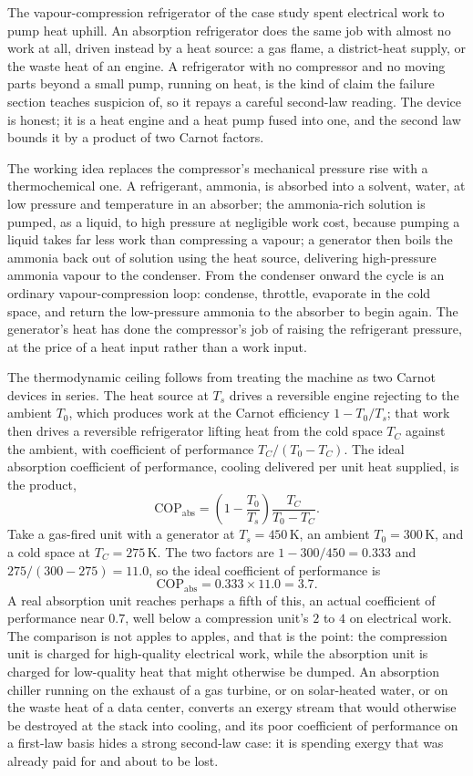 The vapour-compression refrigerator of the case study spent electrical work to
pump heat uphill. An absorption refrigerator does the same job with almost no
work at all, driven instead by a heat source: a gas flame, a district-heat
supply, or the waste heat of an engine. A refrigerator with no compressor and no
moving parts beyond a small pump, running on heat, is the kind of claim the
failure section teaches suspicion of, so it repays a careful second-law reading.
The device is honest; it is a heat engine and a heat pump fused into one, and the
second law bounds it by a product of two Carnot factors.

The working idea replaces the compressor's mechanical pressure rise with a
thermochemical one. A refrigerant, ammonia, is absorbed into a solvent, water,
at low pressure and temperature in an absorber; the ammonia-rich solution is
pumped, as a liquid, to high pressure at negligible work cost, because pumping a
liquid takes far less work than compressing a vapour; a generator then boils the
ammonia back out of solution using the heat source, delivering high-pressure
ammonia vapour to the condenser. From the condenser onward the cycle is an
ordinary vapour-compression loop: condense, throttle, evaporate in the cold
space, and return the low-pressure ammonia to the absorber to begin again. The
generator's heat has done the compressor's job of raising the refrigerant
pressure, at the price of a heat input rather than a work input.

The thermodynamic ceiling follows from treating the machine as two Carnot
devices in series. The heat source at $T_s$ drives a reversible engine rejecting
to the ambient $T_0$, which produces work at the Carnot efficiency $1 -
T_0/T_s$; that work then drives a reversible refrigerator lifting heat from the
cold space $T_C$ against the ambient, with coefficient of performance
$T_C/(T_0 - T_C)$. The ideal absorption coefficient of performance, cooling
delivered per unit heat supplied, is the product,
\[
\mathrm{COP}_{\text{abs}} = \left(1 - \frac{T_0}{T_s}\right)
\frac{T_C}{T_0 - T_C}.
\]
Take a gas-fired unit with a generator at $T_s = 450\,\si{\kelvin}$, an ambient
$T_0 = 300\,\si{\kelvin}$, and a cold space at $T_C = 275\,\si{\kelvin}$. The two
factors are $1 - 300/450 = 0.333$ and $275/(300 - 275) = 11.0$, so the ideal
coefficient of performance is
\[
\mathrm{COP}_{\text{abs}} = 0.333 \times 11.0 = 3.7.
\]
A real absorption unit reaches perhaps a fifth of this, an actual coefficient of
performance near $0.7$, well below a compression unit's $2$ to $4$ on
electrical work. The comparison is not apples to apples, and that is the point:
the compression unit is charged for high-quality electrical work, while the
absorption unit is charged for low-quality heat that might otherwise be dumped.
An absorption chiller running on the exhaust of a gas turbine, or on solar-heated
water, or on the waste heat of a data center, converts an exergy stream that
would otherwise be destroyed at the stack into cooling, and its poor coefficient
of performance on a first-law basis hides a strong second-law case: it is
spending exergy that was already paid for and about to be lost.

